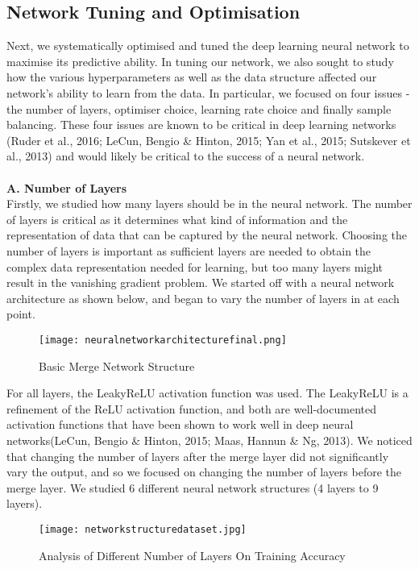 \documentclass{article}
\begin{document}
\subsection{Network Tuning and Optimisation}
Next, we systematically optimised and tuned the deep learning neural network to maximise its predictive ability. In tuning our network, we also sought to study how the various hyperparameters as well as the data structure affected our network's ability to learn from the data. In particular, we focused on four issues - the number of layers, optimiser choice, learning rate choice and finally sample balancing. These four issues are known to be critical in deep learning networks (Ruder et al., 2016; LeCun, Bengio \& Hinton, 2015; Yan et al., 2015;  Sutskever et al., 2013) and would likely be critical to the success of a neural network.\\\\
\textbf{A. Number of Layers} \\
Firstly, we studied how many layers should be in the neural network. The number of layers is critical as it determines what kind of information and the representation of data that can be captured by the neural network. Choosing the number of layers is important as sufficient layers are needed to obtain the complex data representation needed for learning, but too many layers might result in the vanishing gradient problem. We started off with a neural network architecture as shown below, and began to vary the number of layers in at each point.
\begin{figure}[H]
\texttt{[image: neuralnetworkarchitecturefinal.png]}
\centering
\caption{Basic Merge Network Structure}
\end{figure}
For all layers, the LeakyReLU activation function was used. The LeakyReLU is a refinement of the ReLU activation function, and both are well-documented activation functions that have been shown to work well in deep neural networks(LeCun, Bengio \& Hinton, 2015; Maas, Hannun \& Ng, 2013). We noticed that changing the number of layers after the merge layer did not significantly vary the output, and so we focused on changing the number of layers before the merge layer. We studied 6 different neural network structures (4 layers to 9 layers). 
\begin{figure}[H]
\texttt{[image: networkstructuredataset.jpg]}
\centering
\caption{Analysis of Different Number of Layers On Training Accuracy}
\end{figure}
\end{document}

